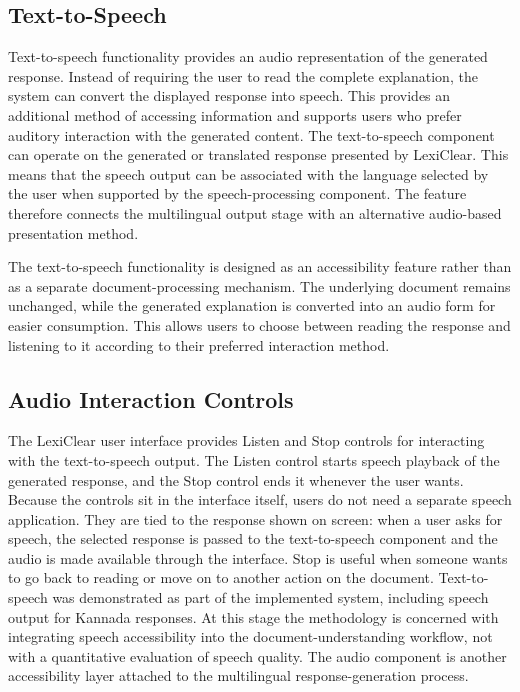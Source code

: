 \documentclass[12pt,a4paper,oneside]{report}
\begin{document}
\subsection{Text-to-Speech}

Text-to-speech functionality provides an audio representation of the generated response. Instead of requiring the user to read the complete explanation, the system can convert the displayed response into speech. This provides an additional method of accessing information and supports users who prefer auditory interaction with the generated content. The text-to-speech component can operate on the generated or translated response presented by LexiClear. This means that the speech output can be associated with the language selected by the user when supported by the speech-processing component. The feature therefore connects the multilingual output stage with an alternative audio-based presentation method.

The text-to-speech functionality is designed as an accessibility feature rather than as a separate document-processing mechanism. The underlying document remains unchanged, while the generated explanation is converted into an audio form for easier consumption. This allows users to choose between reading the response and listening to it according to their preferred interaction method.

\subsection{Audio Interaction Controls}

The LexiClear user interface provides Listen and Stop controls for interacting with the text-to-speech output. The Listen control starts speech playback of the generated response, and the Stop control ends it whenever the user wants. Because the controls sit in the interface itself, users do not need a separate speech application. They are tied to the response shown on screen: when a user asks for speech, the selected response is passed to the text-to-speech component and the audio is made available through the interface. Stop is useful when someone wants to go back to reading or move on to another action on the document. Text-to-speech was demonstrated as part of the implemented system, including speech output for Kannada responses. At this stage the methodology is concerned with integrating speech accessibility into the document-understanding workflow, not with a quantitative evaluation of speech quality. The audio component is another accessibility layer attached to the multilingual response-generation process.
\end{document}
